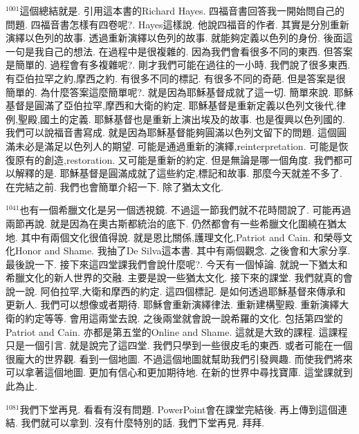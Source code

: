 \documentclass{book}
\begin{document}
$^{1001}$這個總結就是.
引用這本書的Richard Hayes.
四福音書回答我一開始問自己的問題.
四福音書怎樣有四卷呢?.
Hayes這樣說.
他說四福音的作者.
其實是分別重新演繹以色列的故事.
透過重新演繹以色列的故事.
就能夠定義以色列的身份.
後面這一句是我自己的想法.
在過程中是很複雜的.
因為我們會看很多不同的東西.
但答案是簡單的.
過程會有多複雜呢?.
剛才我們可能在過往的一小時.
我們說了很多東西.
有亞伯拉罕之約,摩西之約.
有很多不同的標記.
有很多不同的奇葩.
但是答案是很簡單的.
為什麼答案這麼簡單呢?.
就是因為耶穌基督成就了這一切.
簡單來說.
耶穌基督是圓滿了亞伯拉罕,摩西和大衛的約定.
耶穌基督是重新定義以色列文後代,律例,聖殿,國土的定義.
耶穌基督也是重新上演出埃及的故事.
也是復興以色列國的.
我們可以說福音書寫成.
就是因為耶穌基督能夠圓滿以色列文留下的問題.
這個圓滿未必是滿足以色列人的期望.
可能是通過重新的演繹,reinterpretation.
可能是恢復原有的創造,restoration.
又可能是重新的約定.
但是無論是哪一個角度.
我們都可以解釋的是.
耶穌基督是圓滿成就了這些約定,標記和故事.
那麼今天就差不多了.
在完結之前.
我們也會簡單介紹一下.
除了猶太文化.

$^{1041}$也有一個希臘文化是另一個透視鏡.
不過這一節我們就不花時間說了.
可能再過兩節再說.
就是因為在奧古斯都統治的底下.
仍然都會有一些希臘文化圍繞在猶太地.
其中有兩個文化很值得說.
就是恩比關係,護理文化,Patriot and Cain.
和榮辱文化Honor and Shame.
我抽了De Silva這本書.
其中有兩個觀念.
之後會和大家分享.
最後說一下.
接下來這四堂課我們會說什麼呢?.
今天有一個悼論.
就說一下猶太和希臘文化的新人世界的交融.
主要是說一些猶太文化.
接下來的課堂.
我們就真的會說一說.
阿伯拉罕,大衛和摩西的約定.
這四個標記.
是如何透過耶穌基督來傳承和更新人.
我們可以想像或者期待.
耶穌會重新演繹律法.
重新建構聖殿.
重新演繹大衛的約定等等.
會用這兩堂去說.
之後兩堂就會說一說希羅的文化.
包括第四堂的Patriot and Cain.
亦都是第五堂的Online and Shame.
這就是大致的課程.
這課程只是一個引言.
就是說完了這四堂.
我們只學到一些很皮毛的東西.
或者可能在一個很龐大的世界觀.
看到一個地圖.
不過這個地圖就幫助我們引發興趣.
而使我們將來可以拿著這個地圖.
更加有信心和更加期待地.
在新的世界中尋找寶庫.
這堂課就到此為止.

$^{1081}$我們下堂再見.
看看有沒有問題.
PowerPoint會在課堂完結後.
再上傳到這個連結.
我們就可以拿到.
沒有什麼特別的話.
我們下堂再見.
拜拜.
\newpage
\end{document}
